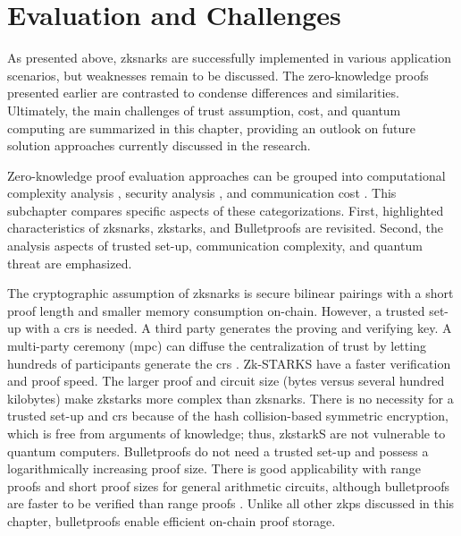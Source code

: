 \section{Evaluation and Challenges}
As presented above, \acrshort{zksnark}s are successfully implemented in various application scenarios, but weaknesses remain to be discussed. The zero-knowledge proofs presented earlier are contrasted to condense differences and similarities. Ultimately, the main challenges of trust assumption, cost, and quantum computing are summarized in this chapter, providing an outlook on future solution approaches currently discussed in the research.

Zero-knowledge proof evaluation approaches can be grouped into computational complexity analysis \citep{LiuWangPengXing, SONIC10.1145/3319535.3339817, PipeZK}, security analysis \citep{Huangetal}, and communication cost \citep{ZHENG, liuetal, gongetal}. This subchapter compares specific aspects of these categorizations. First, highlighted characteristics of \acrshort{zksnark}s, \acrshort{zkstark}s, and Bulletproofs are revisited. Second, the analysis aspects of trusted set-up, communication complexity, and quantum threat are emphasized. 

The cryptographic assumption of \acrshort{zksnark}s is secure bilinear pairings with a short proof length and smaller memory consumption on-chain. However, a trusted set-up with a \acrshort{crs} is needed. A third party generates the proving and verifying key. A multi-party ceremony (\acrshort{mpc}) can diffuse the centralization of trust by letting hundreds of participants generate the \acrshort{crs} \citep{liuetal}. Zk-STARKS have a faster verification and proof speed. The larger proof and circuit size (bytes versus several hundred kilobytes) make \acrshort{zkstark}s more complex than \acrshort{zksnark}s. There is no necessity for a trusted set-up and \acrshort{crs} because of the hash collision-based symmetric encryption, which is free from arguments of knowledge; thus, \acrshort{zkstark}S are not vulnerable to quantum computers. Bulletproofs do not need a trusted set-up and possess a logarithmically increasing proof size. There is good applicability with range proofs and short proof sizes for general arithmetic circuits, although bulletproofs are faster to be verified than range proofs \citep{gongetal}. Unlike all other \acrshort{zkp}s discussed in this chapter, bulletproofs enable efficient on-chain proof storage. 

